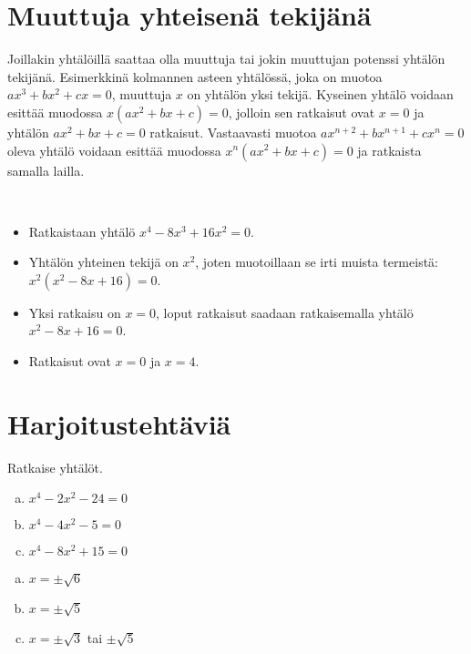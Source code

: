 \section{Muuttuja yhteisenä tekijänä}

Joillakin yhtälöillä saattaa olla muuttuja tai jokin muuttujan potenssi yhtälön tekijänä. Esimerkkinä kolmannen asteen yhtälössä, joka on muotoa \\ $ax^3+bx^2+cx=0$, muuttuja $x$ on yhtälön yksi tekijä. Kyseinen yhtälö voidaan esittää muodossa $x(ax^2+bx+c)=0$, jolloin sen ratkaisut ovat $x=0$ ja yhtälön $ax^2+bx+c=0$ ratkaisut. Vastaavasti muotoa $ax^{n+2}+bx^{n+1}+cx^n=0$ oleva yhtälö voidaan esittää muodossa $x^n(ax^2+bx+c)=0$ ja ratkaista samalla lailla.

\begin{esimerkki}{\ }
\begin{itemize}
    \item Ratkaistaan yhtälö $x^4-8x^3+16x^2=0$.
    \item Yhtälön yhteinen tekijä on $x^2$, joten muotoillaan se irti muista termeistä: $x^2(x^2-8x+16)=0$.
    \item Yksi ratkaisu on $x=0$, loput ratkaisut saadaan ratkaisemalla yhtälö \\ $x^2-8x+16=0$.
    \item Ratkaisut ovat $x=0$ ja $x=4$.

\end{itemize}
\end{esimerkki}

\section{Harjoitustehtäviä}

\begin{tehtava}
    Ratkaise yhtälöt.
    \begin{enumerate}[a)]
        \item $x^4 - 2x^2 - 24 = 0$
        \item $x^4 - 4x^2 - 5 = 0$
        \item $x^4 - 8x^2 + 15 = 0$
    \end{enumerate}
    \begin{vastaus}
        \begin{enumerate}[a)]
            \item $x = \pm\sqrt{6}$
            \item $x = \pm\sqrt{5}$
            \item $x = \pm\sqrt{3}$ tai $\pm\sqrt{5}$
        \end{enumerate}
    \end{vastaus}
\end{tehtava}

